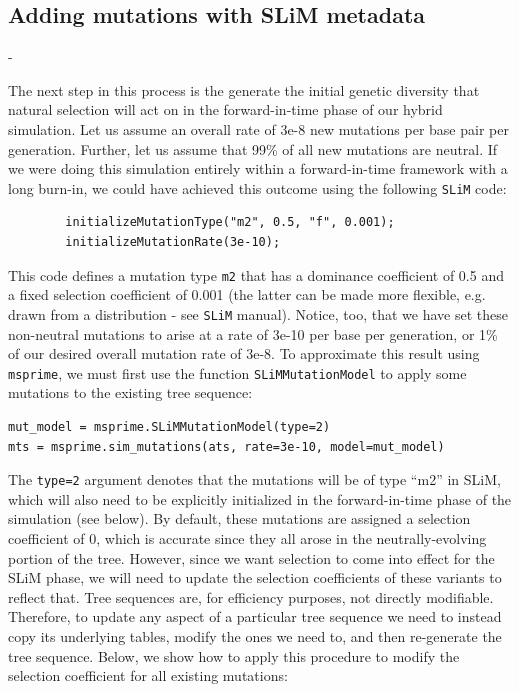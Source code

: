 \documentclass[12pt]{article}
\newcommand{\msprime}[0]{\texttt{msprime}\xspace}
\newcommand{\slim}[0]{\texttt{SLiM}\xspace}
\begin{document}
\subsection*{Adding mutations with SLiM metadata}-

The next step in this process is the generate the initial genetic diversity that natural selection will act on
in the forward-in-time phase of our hybrid simulation. Let us assume an overall rate of 3e-8 new
mutations per base pair per generation. Further, let us assume that 99\% of all new mutations
are neutral. If we were doing this simulation entirely within a forward-in-time framework with a long
burn-in, we could have achieved this outcome using the following \slim code:

\begin{verbatim}
        initializeMutationType("m2", 0.5, "f", 0.001);
        initializeMutationRate(3e-10);
\end{verbatim}

This code defines a mutation type \verb|m2| that has a dominance coefficient of 0.5 and a fixed selection
coefficient of 0.001 (the latter can be made more flexible, e.g. drawn from a distribution - see \slim manual).
Notice, too, that we have set these non-neutral mutations to arise at a rate of 3e-10 per base per generation,
or 1\% of our desired overall mutation rate of 3e-8. To approximate this result using \msprime, we must first
use the function \verb|SLiMMutationModel| to apply some mutations to the existing tree sequence:

\begin{verbatim}
mut_model = msprime.SLiMMutationModel(type=2)
mts = msprime.sim_mutations(ats, rate=3e-10, model=mut_model)
\end{verbatim}

The \verb|type=2| argument denotes that the mutations will be of type ``m2'' in SLiM, which will also
need to be explicitly initialized in the forward-in-time phase of the simulation (see below).
By default, these mutations are assigned a selection coefficient of 0, which is accurate since they
all arose in the neutrally-evolving portion of the tree. However, since we want selection to come into
effect for the SLiM phase, we will need to update the selection coefficients of these variants to reflect that.
Tree sequences are, for efficiency purposes, not directly modifiable. Therefore, to update any aspect of
a particular tree sequence we need to instead copy its underlying tables, modify the ones we need to,
and then re-generate the tree sequence. Below, we show how to apply this procedure to modify the
selection coefficient for all existing mutations:
\end{document}

